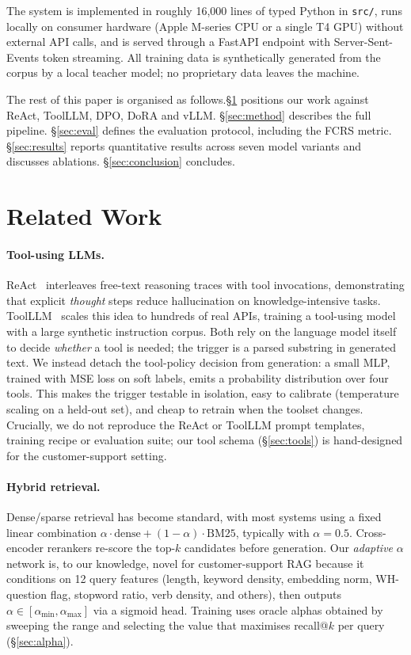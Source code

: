 \documentclass[11pt,a4paper,twocolumn]{article}
\begin{document}
The system is implemented in roughly 16{,}000 lines of typed Python in
\texttt{src/}, runs locally on consumer hardware (Apple M-series CPU or a single T4 GPU)
without external API calls, and is served through a FastAPI endpoint
with Server-Sent-Events token streaming. All training data is
synthetically generated from the corpus by a local teacher model; no
proprietary data leaves the machine.

The rest of this paper is organised as follows.\@ \S\ref{sec:related}
positions our work against ReAct, ToolLLM, DPO, DoRA and vLLM.\@
\S\ref{sec:method} describes the full pipeline.
\S\ref{sec:eval} defines the evaluation protocol, including the FCRS
metric. \S\ref{sec:results} reports quantitative results across seven
model variants and discusses ablations. \S\ref{sec:conclusion} concludes.

\section{Related Work}\label{sec:related}

\paragraph{Tool-using LLMs.} ReAct~\cite{react} interleaves
free-text reasoning traces with tool invocations, demonstrating that
explicit \textit{thought} steps reduce hallucination on
knowledge-intensive tasks. ToolLLM~\cite{toolllm} scales this idea to
hundreds of real APIs, training a tool-using model with a large
synthetic instruction corpus. Both rely on the language model itself to
decide \textit{whether} a tool is needed; the trigger is a parsed
substring in generated text. We instead detach the tool-policy decision
from generation: a small MLP, trained with MSE loss on soft labels,
emits a probability distribution over four tools. This makes the trigger
testable in isolation, easy to calibrate (temperature scaling on a
held-out set), and cheap to retrain when the toolset changes. Crucially,
we do not reproduce the ReAct or ToolLLM prompt templates, training
recipe or evaluation suite; our tool schema (\S\ref{sec:tools}) is
hand-designed for the customer-support setting.

\paragraph{Hybrid retrieval.} Dense/sparse
retrieval has become standard, with most systems using a fixed
linear combination $\alpha \cdot \text{dense} + (1-\alpha) \cdot
\text{BM25}$, typically with $\alpha=0.5$. Cross-encoder rerankers
re-score the top-$k$ candidates before generation. Our
\emph{adaptive} $\alpha$ network is, to our knowledge, novel for
customer-support RAG because it conditions on 12 query features (length,
keyword density, embedding norm, WH-question flag, stopword ratio, verb
density, and others), then outputs
$\alpha \in [\alpha_{\min}, \alpha_{\max}]$ via a sigmoid head. Training
uses oracle alphas obtained by sweeping the range and selecting the
value that maximises recall@$k$ per query (\S\ref{sec:alpha}).
\end{document}
